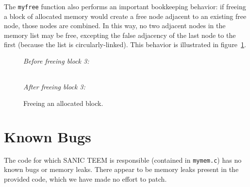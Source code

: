 \documentclass[paper=a4, fontsize=11pt]{scrartcl}
\begin{document}
The \texttt{myfree} function also performs an important bookkeeping behavior: if freeing a block of allocated memory would create a free node adjacent to an existing free node, those nodes are combined. In this way, no two adjacent nodes in the memory list may be free, excepting the false adjacency of the last node to the first (because the list is circularly-linked). This behavior is illustrated in figure~\ref{fig:free}.

\begin{figure}[h]
  \centering
  \textit{Before freeing block 3:}\\
  \\
  \textit{After freeing block 3:}\\

  \caption{Freeing an allocated block.}
  \label{fig:free}
\end{figure}

\section*{Known Bugs}
The code for which SANIC TEEM is responsible (contained in \texttt{mymem.c}) has no known bugs or memory leaks. There appear to be memory leaks present in the provided code, which we have made no effort to patch.
\end{document}
